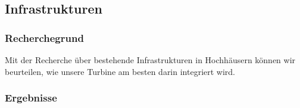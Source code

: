 \subsection{Infrastrukturen}

\subsubsection{Recherchegrund}

Mit der Recherche über bestehende Infrastrukturen in Hochhäusern können wir beurteilen, wie unsere Turbine am besten darin integriert wird.



\subsubsection{Ergebnisse}
